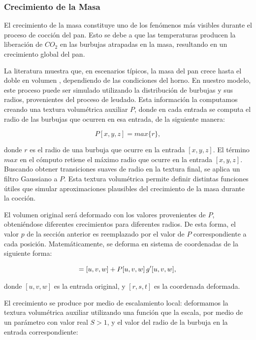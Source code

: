 \subsubsection{Crecimiento de la Masa}
El crecimiento de la masa constituye uno de los fenómenos más visibles durante el proceso de cocción del pan.
Esto se debe a que las temperaturas producen la liberación de $CO_2$ en las burbujas atrapadas en la masa, resultando en un crecimiento global del pan.

La literatura muestra que, en escenarios típicos, la masa del pan crece hasta el doble en volumen \cite{Fan1999}, dependiendo de las condiciones del horno.
En nuestro modelo, este proceso puede ser simulado utilizando la distribución de burbujas y sus radios, provenientes del proceso de leudado.
Esta información la computamos creando una textura volumétrica auxiliar $P$, donde en cada entrada se computa el radio de las burbujas que ocurren en esa entrada, de la siguiente manera:

$$P[x,y,z] = max \bigg\{r\bigg\},$$

\noindent donde $r$ es el radio de una burbuja que ocurre en la entrada $[x,y,z]$.
El término $max$ en el cómputo retiene el máximo radio que ocurre en la entrada $[x,y,z]$.
Buscando obtener transiciones suaves de radio en la textura final, se aplica un filtro Gaussiano a $P$.
Esta textura volumétrica permite definir distintas funciones útiles que simular aproximaciones plausibles del crecimiento de la masa durante la cocción.

El volumen original será deformado con los valores provenientes de $P$, obteniéndose diferentes crecimientos para diferentes radios.
De esta forma, el valor $p$ de la sección anterior es reemplazado por el valor de $P$ correspondiente a cada posición.
Matemáticamente, se deforma en sistema de coordenadas de la siguiente forma:

\begin{equation*}
[r,s,t] = [u,v,w] + P[u,v,w] \, g'[u,v,w], \\
\end{equation*}

\noindent donde $[u,v,w]$ es la entrada original, y $[r,s,t]$ es la coordenada deformada.

El crecimiento se produce por medio de escalamiento local: deformamos la textura volumétrica auxiliar utilizando una función que la escala, por medio de un parámetro con valor real $S > 1$, y el valor del radio de la burbuja en la entrada correspondiente:

